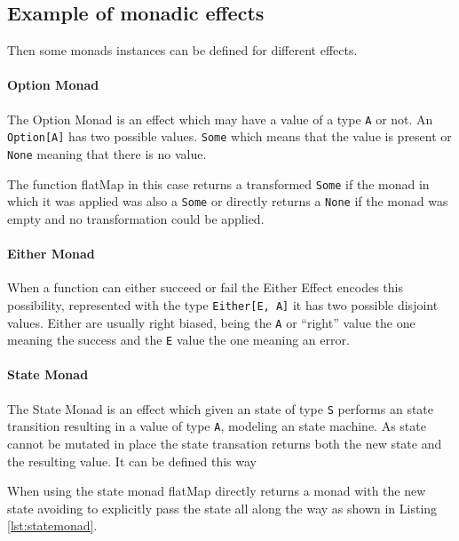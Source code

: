 \documentclass[../main.tex]{subfiles}
\begin{document}
\subsection{Example of monadic effects}
Then some monads instances can be defined for different effects.

\paragraph{Option Monad}
The Option Monad is an effect which may have a value of a type \texttt{A} or
not. An \texttt{Option[A]} has two possible values. \texttt{Some} which means
that the value is present or \texttt{None} meaning that there is no value.

The function flatMap in this case returns a transformed \texttt{Some} if the monad in which
it was applied was also a \texttt{Some} or directly returns a \texttt{None} if
the monad was empty and no transformation could be applied.



\paragraph{Either Monad}
When a function can either succeed or fail the Either Effect encodes this
possibility, represented with the type \texttt{Either[E, A]} it has two possible
disjoint values. Either are usually right biased, being the \texttt{A} or
``right'' value the one meaning the success and the \texttt{E} value the one
meaning an error.



\paragraph{State Monad}
The State Monad is an effect which given an state of type \texttt{S} performs an state
transition resulting in a value of type \texttt{A}, modeling an state machine.
As state cannot be mutated in place the state transation returns both the new
state and the resulting value. It can be defined this way

When using the state monad flatMap directly returns a monad with the new state
avoiding to explicitly pass the state all along the way as shown in Listing \ref{lst:statemonad}.
\end{document}
